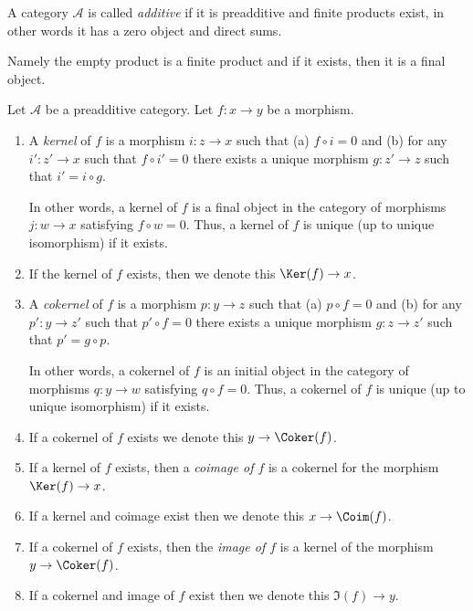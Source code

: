 \begin{definition}
\label{definition-additive-category}
A category $\mathcal{A}$ is called {\it additive}
if it is preadditive and finite products exist, in other
words it has a zero object and direct sums.
\end{definition}

\noindent
Namely the empty product is a finite product and
if it exists, then it is a final object.

\begin{definition}
\label{definition-kernel}
Let $\mathcal{A}$ be a preadditive category.
Let $f : x \to y$ be a morphism.
\begin{enumerate}
\item A {\it kernel} of $f$ is a morphism
$i : z \to x$ such that (a) $f \circ i = 0$ and (b)
for any $i' : z' \to x$ such that $f \circ i' = 0$ there
exists a unique morphism $g : z' \to z$ such that
$i' = i \circ g$.

In other words, a kernel of $f$ is a final object
in the category of morphisms $j : w \to x$ satisfying
$f \circ w = 0$.
Thus, a kernel of $f$ is unique (up to unique isomorphism)
if it exists.
\item If the kernel of $f$ exists, then we denote
this $\Ker(f) \to x$.
\item A {\it cokernel} of $f$ is a morphism
$p : y \to z$ such that (a) $p \circ f = 0$ and (b)
for any $p' : y \to z'$ such that $p' \circ f = 0$ there
exists a unique morphism $g : z \to z'$ such that
$p' = g \circ p$.

In other words, a cokernel of $f$ is an initial object
in the category of morphisms $q : y \to w$ satisfying
$q \circ f = 0$.
Thus, a cokernel of $f$ is unique (up to unique isomorphism)
if it exists.
\item If a cokernel of $f$ exists we denote this
$y \to \Coker(f)$.
\item If a kernel of $f$ exists, then a {\it coimage
of $f$} is a cokernel for the morphism $\Ker(f) \to x$.
\item If a kernel and coimage exist then we denote this
$x \to \Coim(f)$.
\item If a cokernel of $f$ exists, then the {\it image of
$f$} is a kernel of the morphism $y \to \Coker(f)$.
\item If a cokernel and image of $f$ exist then we denote
this $\Im(f) \to y$.
\end{enumerate}
\end{definition}

